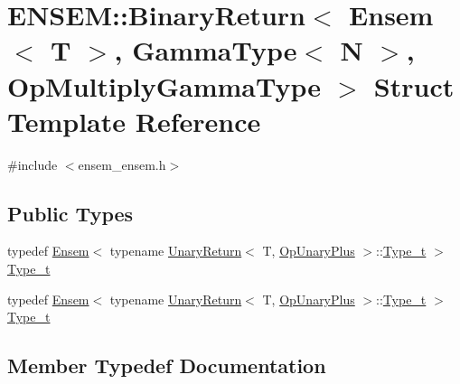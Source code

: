 \hypertarget{structENSEM_1_1BinaryReturn_3_01Ensem_3_01T_01_4_00_01GammaType_3_01N_01_4_00_01OpMultiplyGammaType_01_4}{}\section{E\+N\+S\+EM\+:\+:Binary\+Return$<$ Ensem$<$ T $>$, Gamma\+Type$<$ N $>$, Op\+Multiply\+Gamma\+Type $>$ Struct Template Reference}
\label{structENSEM_1_1BinaryReturn_3_01Ensem_3_01T_01_4_00_01GammaType_3_01N_01_4_00_01OpMultiplyGammaType_01_4}


{\ttfamily \#include $<$ensem\+\_\+ensem.\+h$>$}

\subsection*{Public Types}
\begin{DoxyCompactItemize}
\item 
typedef \mbox{\hyperlink{classENSEM_1_1Ensem}{Ensem}}$<$ typename \mbox{\hyperlink{structENSEM_1_1UnaryReturn}{Unary\+Return}}$<$ T, \mbox{\hyperlink{structENSEM_1_1OpUnaryPlus}{Op\+Unary\+Plus}} $>$\+::\mbox{\hyperlink{structENSEM_1_1BinaryReturn_3_01Ensem_3_01T_01_4_00_01GammaType_3_01N_01_4_00_01OpMultiplyGammaType_01_4_ab57ac60220530b540f3dfbb2cd5279df}{Type\+\_\+t}} $>$ \mbox{\hyperlink{structENSEM_1_1BinaryReturn_3_01Ensem_3_01T_01_4_00_01GammaType_3_01N_01_4_00_01OpMultiplyGammaType_01_4_ab57ac60220530b540f3dfbb2cd5279df}{Type\+\_\+t}}
\item 
typedef \mbox{\hyperlink{classENSEM_1_1Ensem}{Ensem}}$<$ typename \mbox{\hyperlink{structENSEM_1_1UnaryReturn}{Unary\+Return}}$<$ T, \mbox{\hyperlink{structENSEM_1_1OpUnaryPlus}{Op\+Unary\+Plus}} $>$\+::\mbox{\hyperlink{structENSEM_1_1BinaryReturn_3_01Ensem_3_01T_01_4_00_01GammaType_3_01N_01_4_00_01OpMultiplyGammaType_01_4_ab57ac60220530b540f3dfbb2cd5279df}{Type\+\_\+t}} $>$ \mbox{\hyperlink{structENSEM_1_1BinaryReturn_3_01Ensem_3_01T_01_4_00_01GammaType_3_01N_01_4_00_01OpMultiplyGammaType_01_4_ab57ac60220530b540f3dfbb2cd5279df}{Type\+\_\+t}}
\end{DoxyCompactItemize}


\subsection{Member Typedef Documentation}
\mbox{\label{structENSEM_1_1BinaryReturn_3_01Ensem_3_01T_01_4_00_01GammaType_3_01N_01_4_00_01OpMultiplyGammaType_01_4_ab57ac60220530b540f3dfbb2cd5279df}} 
